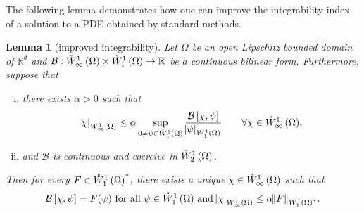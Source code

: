 \documentclass[final]{siamltex}
\newtheorem{lem}[theorem]{Lemma}
\begin{document}
The following lemma demonstrates how one can improve the integrability index of a solution to a PDE obtained by standard methods.
\begin{lem}[improved integrability]\label{lem:baneso} Let $\Omega$ be an open Lipschitz bounded domain of ${\mathbb{R}}^d$ and  ${\mathcal{B}} : {{\mathring{W}^{1}_{\infty}\del{\Omega}}} \times {{\mathring{W}^{1}_{1}\del{\Omega}}} \to {\mathbb{R}}$ be a continuous bilinear form. Furthermore, suppose that 
	\begin{enumerate}[(i)]
		\item there exists $\alpha > 0$ such that 
			\begin{align} \label{eq:baneso_inf_sup_c}
				{\abs{{\chi}}_{{W^{{{1}}}_{{{\infty}}}\del{{{\Omega}}}}}} \leq \alpha \sup_{0\neq \psi\in{{\mathring{W}^{{1}}_{{1}}\del{{\Omega}}}}}
					\frac{{\mathcal{B}}\sbr{\chi,\psi}}{{\abs{{\psi}}_{{W^{{{1}}}_{{{1}}}\del{{{\Omega}}}}}}} \qquad  \forall \chi \in {{\mathring{W}^{1}_{\infty}\del{\Omega}}}, 
			\end{align}
		\item and ${\mathcal{B}}$ is continuous and coercive in ${{\mathring{W}^{{1}}_{2}\del{\Omega}}}$.
	\end{enumerate}
Then for every $F \in {{\mathring{W}^{1}_{1}\del{\Omega}}}^*$, there exists a unique $\chi \in {{\mathring{W}^{{1}}_{{\infty}}\del{\Omega}}}$ such that 
	\begin{align}\label{eq:baneso_well_posed}
		{\mathcal{B}}\sbr{\chi,\psi} = F(\psi) \mbox{ for all }  \psi \in {{\mathring{W}^{{1}}_{{1}}\del{{\Omega}}}} \mbox{ and } 
		{\abs{{\chi}}_{{W^{{1}}_{{\infty}}\del{{\Omega}}}}} \leq \alpha {\norm{{F}}_{{{W^{{1}}_{{1}}\del{{\Omega}}}}^*}}. 
	\end{align}
\end{lem}
\end{document}
